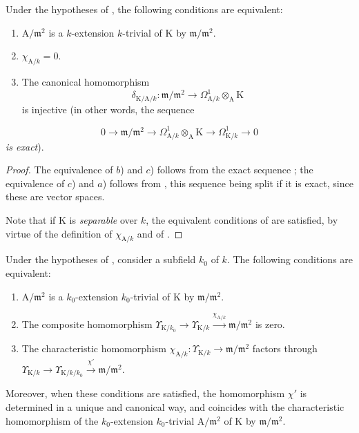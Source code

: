 \begin{proposition}[22.2.9]
\label{0.22.2.9}
Under the hypotheses of , the following conditions are equivalent:
\begin{enumerate}
  \item[a)] $\mathrm{A}/\mathfrak{m}^2$ is a $k$-extension $k$-trivial of $\mathrm{K}$ by $\mathfrak{m}/\mathfrak{m}^2$.
  \item[b)] $\chi_{\mathrm{A}/k}=0$.
  \item[c)] The canonical homomorphism 
  \[
    \delta_{\mathrm{K}/\mathrm{A}/k}:\mathfrak{m}/\mathfrak{m}^2\to\Omega^1_{\mathrm{A}/k}\otimes_\mathrm{A}\mathrm{K}
  \]
  is injective (in other words, the sequence
\end{enumerate}
\[
\label{0.22.2.9.1}
  0\to\mathfrak{m}/\mathfrak{m}^2\to\Omega^1_{\mathrm{A}/k}\otimes_\mathrm{A}\mathrm{K}\to\Omega^1_{\mathrm{K}/k}\to 0
  \tag{22.2.9.1}
\]
\emph{is exact}).
\end{proposition}

\begin{proof}
The equivalence of $b$) and $c$) follows from the exact sequence ; the equivalence of $c$) and $a$) follows from , this sequence being split if it is exact, since these are vector spaces.

Note that if $\mathrm{K}$ is \emph{separable} over $k$, the equivalent conditions of  are satisfied, by virtue of the definition of $\chi_{\mathrm{A}/k}$  and of .
\end{proof}

\begin{corollary}[22.2.10]
\label{0.22.2.10}
Under the hypotheses of , consider a subfield $k_0$ of $k$.
The following conditions are equivalent:
\begin{enumerate}
  \item[a)] $\mathrm{A}/\mathfrak{m}^2$ is a $k_0$-extension $k_0$-trivial of $\mathrm{K}$ by $\mathfrak{m}/\mathfrak{m}^2$.
  \item[b)] The composite homomorphism $\Upsilon_{\mathrm{K}/k_0}\to\Upsilon_{\mathrm{K}/k}\xrightarrow{\chi_{\mathrm{A}/k}}\mathfrak{m}/\mathfrak{m}^2$ is zero.
  \item[c)] The characteristic homomorphism $\chi_{\mathrm{A}/k}:\Upsilon_{\mathrm{K}/k}\to\mathfrak{m}/\mathfrak{m}^2$ factors through $\Upsilon_{\mathrm{K}/k}\to\Upsilon_{\mathrm{K}/k/k_0}\xrightarrow{\chi'}\mathfrak{m}/\mathfrak{m}^2$.
\end{enumerate}
Moreover, when these conditions are satisfied, the homomorphism $\chi'$ is determined in a unique and canonical way, and coincides with the characteristic homomorphism of the $k_0$-extension $k_0$-trivial $\mathrm{A}/\mathfrak{m}^2$ of $\mathrm{K}$ by $\mathfrak{m}/\mathfrak{m}^2$.
\end{corollary}

